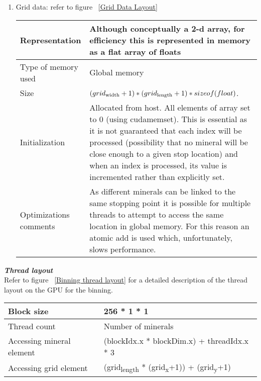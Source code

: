 \documentclass[11pt]{IEEEtran}
\begin{document}
\begin{enumerate}
	\item Grid data: refer to figure ~\ref{Grid Data Layout}\\\newline
	  \begin{figure*}[ht]
	    \begin{center}	
	    \caption[Grid data layout]{Memory layout of the Grid data}
	    \label{Grid Data Layout}
	      \begin{tabular}{|p{4cm}|p{12cm}|}
  	    \hline
  	    Representation & Although conceptually a 2-d array, for efficiency this is represented in memory as a flat array of floats\\
  	    \hline
  	    Type of memory used & Global memory\\
  	    \hline
  	    Size & $ (grid\textsubscript{width}+1) * (grid\textsubscript{length}+1) * sizeof(float) $.\\
  	    \hline
  	    Initialization & Allocated from host. All elements of array set to 0 (using cudamemset). This is essential as it is not guaranteed that each index will be processed (possibility that no mineral will be close enough to a given stop location) and when an index is processed, its value is incremented rather than explicitly set. \\
  	    \hline
  	  Optimizations comments & As different minerals can be linked to the same stopping point it is possible for multiple threads to attempt to access the same location in global memory. For this reason an atomic add is used which, unfortunately, slows performance. \\
  	    \hline
  	    \end{tabular}
  	  \end{center}	
  	  \end{figure*}
  	\end{enumerate}

\textit{\textbf{Thread layout}}\\[1\baselineskip] 
Refer to figure ~\ref{Binning thread layout}	for a detailed description of the thread layout on the GPU for the binning.
	 
	  \begin{figure*}[ht]
	    \begin{center}	
	    \caption[Binning thread layout]{Thread layout for the binning}
	    \label{Binning thread layout}
	    \begin{tabular}{|p{4cm}|p{12cm}|}
		\hline
		Block size & 256 * 1 * 1\\
		\hline
		Thread count & Number of minerals\\
		\hline
		Accessing mineral element & 	(blockIdx.x * blockDim.x) + threadIdx.x * 3\\		    		\hline
		Accessing grid element & (grid\textsubscript{length} * (grid\textsubscript{x}+1)) + (grid\textsubscript{y}+1)\\
		\hline
		\end{tabular}
	  \end{center}
	  \end{figure*}
\end{document}
